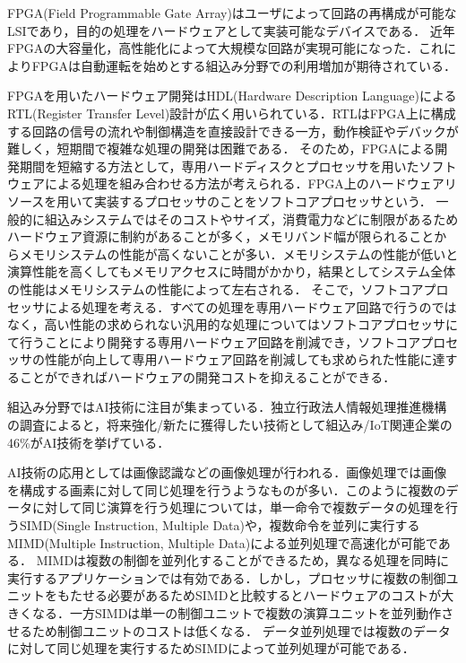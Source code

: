 FPGA(Field Programmable Gate Array)はユーザによって回路の再構成が可能なLSIであり，目的の処理をハードウェアとして実装可能なデバイスである．
近年FPGAの大容量化，高性能化によって大規模な回路が実現可能になった．これによりFPGAは自動運転を始めとする組込み分野での利用増加が期待されている．

FPGAを用いたハードウェア開発はHDL(Hardware Description Language)によるRTL(Register Transfer Level)設計が広く用いられている．RTLはFPGA上に構成する回路の信号の流れや制御構造を直接設計できる一方，動作検証やデバックが難しく，短期間で複雑な処理の開発は困難である．\cite{bib:fpga}
そのため，FPGAによる開発期間を短縮する方法として，専用ハードディスクとプロセッサを用いたソフトウェアによる処理を組み合わせる方法が考えられる．FPGA上のハードウェアリソースを用いて実装するプロセッサのことをソフトコアプロセッサという．
一般的に組込みシステムではそのコストやサイズ，消費電力などに制限があるためハードウェア資源に制約があることが多く，メモリバンド幅が限られることからメモリシステムの性能が高くないことが多い．メモリシステムの性能が低いと演算性能を高くしてもメモリアクセスに時間がかかり，結果としてシステム全体の性能はメモリシステムの性能によって左右される．\cite{bib:2}
そこで，ソフトコアプロセッサによる処理を考える．すべての処理を専用ハードウェア回路で行うのではなく，高い性能の求められない汎用的な処理についてはソフトコアプロセッサにて行うことにより開発する専用ハードウェア回路を削減でき，ソフトコアプロセッサの性能が向上して専用ハードウェア回路を削減しても求められた性能に達することができればハードウェアの開発コストを抑えることができる．

組込み分野ではAI技術に注目が集まっている．独立行政法人情報処理推進機構の調査によると，将来強化/新たに獲得したい技術として組込み/IoT関連企業の46\%がAI技術を挙げている．\cite{bib:ipa}

AI技術の応用としては画像認識などの画像処理が行われる．画像処理では画像を構成する画素に対して同じ処理を行うようなものが多い．このように複数のデータに対して同じ演算を行う処理については，単一命令で複数データの処理を行うSIMD(Single Instruction, Multiple Data)や，複数命令を並列に実行するMIMD(Multiple Instruction, Multiple Data)による並列処理で高速化が可能である．\cite{bib:simd_mimd}
MIMDは複数の制御を並列化することができるため，異なる処理を同時に実行するアプリケーションでは有効である．しかし，プロセッサに複数の制御ユニットをもたせる必要があるためSIMDと比較するとハードウェアのコストが大きくなる．一方SIMDは単一の制御ユニットで複数の演算ユニットを並列動作させるため制御ユニットのコストは低くなる．
データ並列処理では複数のデータに対して同じ処理を実行するためSIMDによって並列処理が可能である．

